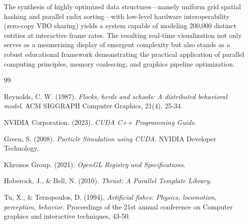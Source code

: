 \documentclass[12pt,a4paper]{report}
\begin{document}
The synthesis of highly optimized data structures—namely uniform grid spatial hashing and parallel radix sorting—with low-level hardware interoperability (zero-copy VBO sharing) yields a system capable of modeling 200,000 distinct entities at interactive frame rates. The resulting real-time visualization not only serves as a mesmerizing display of emergent complexity but also stands as a robust educational framework demonstrating the practical application of parallel computing principles, memory coalescing, and graphics pipeline optimization.

\renewcommand{\bibname}{References}
\begin{thebibliography}{99}

Reynolds, C. W. (1987). 
\textit{Flocks, herds and schools: A distributed behavioral model}. 
ACM SIGGRAPH Computer Graphics, 21(4), 25-34.

NVIDIA Corporation. (2023). 
\textit{CUDA C++ Programming Guide}.

Green, S. (2008). 
\textit{Particle Simulation using CUDA}. 
NVIDIA Developer Technology.

Khronos Group. (2021). 
\textit{OpenGL Registry and Specifications}.

Hoberock, J., \& Bell, N. (2010).
\textit{Thrust: A Parallel Template Library}.

Tu, X., \& Terzopoulos, D. (1994).
\textit{Artificial fishes: Physics, locomotion, perception, behavior}.
Proceedings of the 21st annual conference on Computer graphics and interactive techniques, 43-50.

\end{thebibliography}
\end{document}
